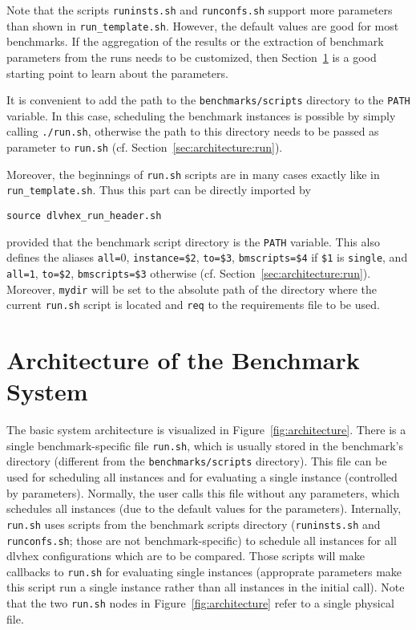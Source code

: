 \documentclass[a4paper]{article}
\newcommand{\dlvhex}{{\sc dlvhex}}
\begin{document}
		Note that the scripts {\tt runinsts.sh} and {\tt runconfs.sh} support more
		parameters than shown in {\tt run\_template.sh}.
		However, the default values are good for most benchmarks.
		If the aggregation of the results or
		the extraction of benchmark parameters from the runs needs to be customized,
		then Section~\ref{sec:architecture} is a good starting point to learn about the parameters.
		
		It is convenient to add the path to the {\tt benchmarks/scripts} directory to the {\tt PATH} variable.
		In this case, scheduling the benchmark instances is possible by simply calling {\tt ./run.sh},
		otherwise the path to this directory needs to be passed as parameter to {\tt run.sh}
		(cf. Section~\ref{sec:architecture:run}).

		Moreover, the beginnings of {\tt run.sh} scripts are in many cases exactly
		like in {\tt run\_template.sh}. Thus this part can be directly imported by
		\begin{center}
			{\tt source dlvhex\_run\_header.sh}
		\end{center}
		provided that the benchmark script directory is the {\tt PATH} variable.
		This also defines the aliases
		{\tt all=$0$}, {\tt instance=\$2}, {\tt to=\$3}, {\tt bmscripts=\$4}
		if {\tt \$1} is {\tt single}, and
		{\tt all=1}, {\tt to=\$2}, {\tt bmscripts=\$3} otherwise (cf. Section~\ref{sec:architecture:run}).
		Moreover, {\tt mydir} will be set to the absolute path of the directory where
		the current {\tt run.sh} script is located and {\tt req} to the requirements file to be used.
			
	\section{Architecture of the Benchmark System}
	\label{sec:architecture}

		The basic system architecture is visualized in Figure~\ref{fig:architecture}.
		There is a single benchmark-specific file {\tt run.sh}, which is usually stored
		in the benchmark's directory (different from the {\tt benchmarks/scripts} directory).
		This file can be used for scheduling all instances and for evaluating a single instance
		(controlled by parameters). Normally, the user calls this file without any parameters,
		which schedules all instances (due to the default values for the parameters).
		Internally, {\tt run.sh} uses scripts from the benchmark scripts directory
		({\tt runinsts.sh} and {\tt runconfs.sh}; those are not benchmark-specific) to schedule all instances for all \dlvhex{} configurations
		which are to be compared. Those scripts will make callbacks to {\tt run.sh} for evaluating single instances
		(approprate parameters make this script run a single instance rather than all instances in the initial call).
		Note that the two {\tt run.sh} nodes in Figure~\ref{fig:architecture} refer
		to a single physical file.
		
\end{document}
